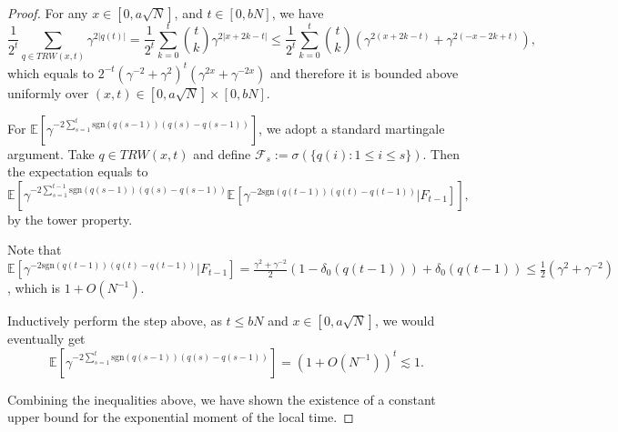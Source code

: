 \documentclass[10pt,a4paper]{amsart}
\begin{document}
\begin{proof}
For any $x \in [0, a\sqrt{N}]$, and $t \in [0, bN]$, we have
\begin{equation}
        \frac{1}{2^{t}}\sum_{q \in TRW(x,t)} \gamma^{2|q(t)|} =\frac{1}{2^t} \sum_{k=0}^t {{t} \choose {k}} \gamma^{2|x+2k-t|} \leq \frac{1}{2^t} \sum_{k=0}^t {{t} \choose {k}} \left(\gamma^{2(x+2k-t)}+\gamma^{2(-x-2k+t)}\right),
\end{equation}
which equals to $2^{-t}\left(\gamma^{-2}+\gamma^2\right)^t\left(\gamma^{2x}+\gamma^{-2x}\right)$ and therefore it is bounded above uniformly over $(x, t) \in [0, a\sqrt{N}] \times [0, bN]$.

For $\mathbb{E}[\gamma^{-2\sum_{s=1}^t \text{sgn}(q(s-1))(q(s)-q(s-1))}]$, we adopt a standard martingale argument. Take $q \in TRW(x,t)$ and define $\mathcal{F}_s:=\sigma(\{q(i): 1 \leq i \leq s\})$. Then the expectation equals to
\begin{equation}
    \mathbb{E}[\gamma^{-2\sum_{s=1}^{t-1} \text{sgn}(q(s-1))(q(s)-q(s-1))} \mathbb{E}[\gamma^{-2\text{sgn}(q(t-1))(q(t)-q(t-1))}|F_{t-1}]],
\end{equation}
by the tower property.

Note that $\mathbb{E}[\gamma^{-2\text{sgn}(q(t-1))(q(t)-q(t-1))}|F_{t-1}]=\frac{\gamma^2+\gamma^{-2}}{2}(1-\delta_0(q(t-1)))+\delta_0(q(t-1)) \leq \frac{1}{2}\left(\gamma^2+\gamma^{-2}\right)$, which is $1+O(N^{-1})$.

Inductively perform the step above, as $t \leq bN$ and $x \in [0, a\sqrt{N}]$, we would eventually get 
\begin{equation}
    \mathbb{E}\left[\gamma^{-2\sum_{s=1}^t \text{sgn}(q(s-1))(q(s)-q(s-1))}\right] =(1+O(N^{-1}))^t \lesssim 1.
\end{equation}
    

Combining the inequalities above, we have shown the existence of a constant upper bound for the exponential moment of the local time.

\end{proof}
\end{document}
